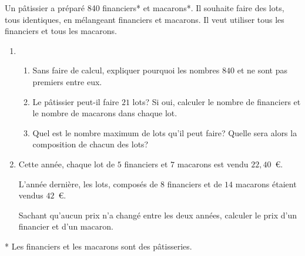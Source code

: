 
\medskip 

Un pâtissier a préparé 840 financiers* et  macarons*. Il souhaite faire des lots, tous identiques, en mélangeant financiers et macarons. Il veut utiliser tous les financiers et tous les macarons. 

\medskip

\begin{enumerate}
\item 
	\begin{enumerate}
		\item Sans faire de calcul, expliquer pourquoi les nombres $840$ et  ne sont pas premiers entre eux. 
		\item Le pâtissier peut-il faire $21$ lots? Si oui, calculer le nombre de financiers et le nombre de macarons dans chaque lot. 
		\item Quel est le nombre maximum de lots qu'il peut faire? Quelle sera alors la composition de chacun des lots? 
	\end{enumerate}
\item Cette année, chaque lot de $5$ financiers et $7$ macarons est vendu $22,40$~\euro. 

L'année dernière, les lots, composés de $8$ financiers et de $14$ macarons étaient vendus $42$~\euro. 

Sachant qu'aucun prix n'a changé entre les deux années, calculer le prix d'un financier et d'un macaron. 
\medskip
\end{enumerate}
* Les financiers et les macarons sont des pâtisseries. 


\bigskip

